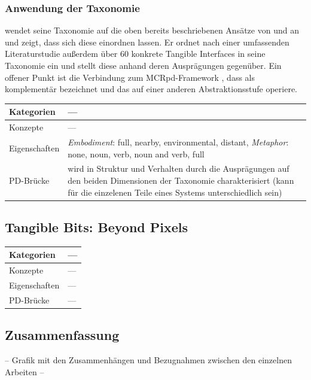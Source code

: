 \subsubsection{Anwendung der Taxonomie}
\citeauthor{Fishkin04} wendet seine Taxonomie auf die oben bereits beschriebenen Ansätze von \citep{Holmquist99} und \citep{Underkoffler99} an und zeigt, dass sich diese einordnen lassen. Er ordnet nach einer umfassenden Literaturstudie außerdem über 60 konkrete Tangible Interfaces in seine Taxonomie ein und stellt diese anhand deren Ausprägungen gegenüber. Ein offener Punkt ist die Verbindung zum \gls{MCRpd}-Framework \citep{Ullmer00}, dass \citeauthor{Fishkin04} als komplementär bezeichnet und das auf einer anderen Abstraktionsstufe operiere. 

\begin{tabular}{| p{3cm} | p{10cm} |}
  \hline
  Kategorien & --- \\ \hline
  Konzepte & --- \\ \hline
  Eigenschaften & \emph{Embodiment}: full, nearby, environmental, distant, \emph{Metaphor}: none, noun, verb, noun and verb, full\\ \hline
  PD-Brücke & wird in Struktur und Verhalten durch die Ausprägungen auf den beiden Dimensionen der Taxonomie charakterisiert (kann für die einzelenen Teile eines Systems unterschiedlich sein)  \\ \hline
\end{tabular} 

\subsection{Tangible Bits: Beyond Pixels}
\citep{Ishii08}

\begin{tabular}{| p{3cm} | p{10cm} |}
  \hline
  Kategorien & --- \\ \hline
  Konzepte & --- \\ \hline
  Eigenschaften & --- \\ \hline
  PD-Brücke & --- \\ \hline
\end{tabular} 

\subsection{Zusammenfassung} %
\label{sub:tui_konzepte_zusammenfassung}

-- Grafik mit den Zusammenhängen und Bezugnahmen zwischen den einzelnen Arbeiten --

